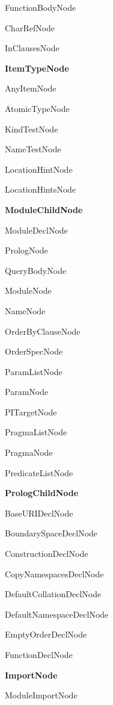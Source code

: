\begin{description}
\begin{description}
\begin{description}
  \end{description}
\item FunctionBodyNode
\item CharRefNode
\item InClausesNode
\item \textbf{ItemTypeNode}
  \begin{description}
  \item AnyItemNode
  \item AtomicTypeNode
  \item KindTestNode
  \item NameTestNode
  \end{description}
\item LocationHintNode
\item LocationHintsNode
\item \textbf{ModuleChildNode}
  \begin{description}
  \item ModuleDeclNode
  \item PrologNode
  \item QueryBodyNode
  \end{description}
\item ModuleNode
\item NameNode
\item OrderByClauseNode
\item OrderSpecNode
\item ParamListNode
\item ParamNode
\item PITargetNode
\item PragmaListNode
\item PragmaNode
\item PredicateListNode
\item \textbf{PrologChildNode}
  \begin{description}
  \item BaseURIDeclNode
  \item BoundarySpaceDeclNode
  \item ConstructionDeclNode
  \item CopyNamespacesDeclNode
  \item DefaultCollationDeclNode
  \item DefaultNamespaceDeclNode
  \item EmptyOrderDeclNode
  \item FunctionDeclNode
  \item \textbf{ImportNode}
    \begin{description}
    \item ModuleImportNode

\end{description}
\end{description}
\end{description}
\end{description}

